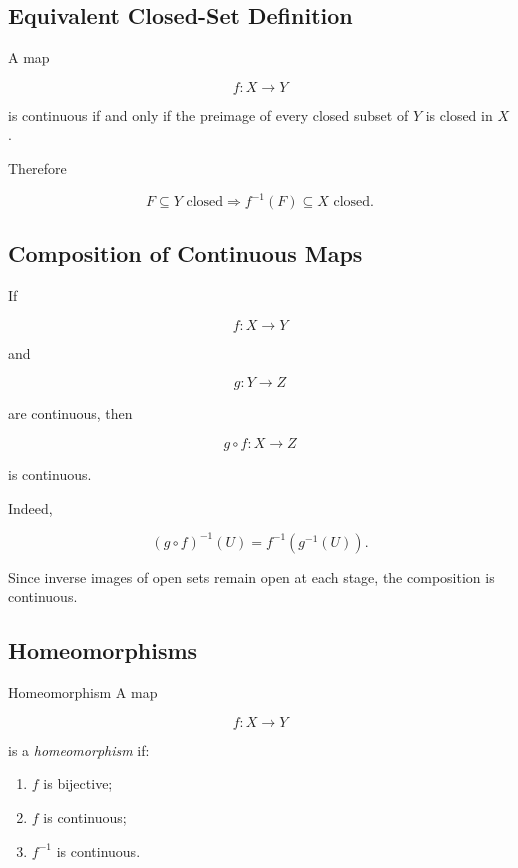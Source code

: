 \subsection{Equivalent Closed-Set Definition}
\label{subsec:continuity-closed-sets}

A map

\[
f:X\to Y
\]

is continuous if and only if the preimage of every closed subset of \(Y\)
is closed in \(X\).

Therefore

\[
\boxed{
F\subseteq Y\text{ closed}
\Longrightarrow
f^{-1}(F)\subseteq X\text{ closed}.
}
\]

\subsection{Composition of Continuous Maps}
\label{subsec:composition-continuous}

If

\[
f:X\to Y
\]

and

\[
g:Y\to Z
\]

are continuous, then

\[
\boxed{
g\circ f:X\to Z
}
\]

is continuous.

Indeed,

\[
(g\circ f)^{-1}(U)
=
f^{-1}(g^{-1}(U)).
\]

Since inverse images of open sets remain open at each stage, the composition
is continuous.

\subsection{Homeomorphisms}
\label{subsec:homeomorphisms}

\begin{definitionbox}{Homeomorphism}
A map

\[
f:X\to Y
\]

is a \emph{homeomorphism} if:

\begin{enumerate}
    \item \(f\) is bijective;
    \item \(f\) is continuous;
    \item \(f^{-1}\) is continuous.
\end{enumerate}
\end{definitionbox}

